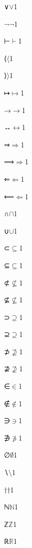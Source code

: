 {{∨}{{\ensuremath{\vee}}}1

{¬}{{\ensuremath{\neg}}}1

{⊢}{{\ensuremath{\vdash}}}1





{⟨}{{\ensuremath{\langle}}}1

{⟩}{{\ensuremath{\rangle}}}1



{↦}{{\ensuremath{\mapsto}}}1

{→}{{\ensuremath{\rightarrow}}}1

{↔}{{\ensuremath{\leftrightarrow}}}1

{⇒}{{\ensuremath{\Rightarrow}}}1

{⟹}{{\ensuremath{\Longrightarrow}}}1

{⇐}{{\ensuremath{\Leftarrow}}}1

{⟸}{{\ensuremath{\Longleftarrow}}}1



{∩}{{\ensuremath{\cap}}}1

{∪}{{\ensuremath{\cup}}}1

{⊂}{{\ensuremath{\subseteq}}}1

{⊆}{{\ensuremath{\subseteq}}}1

{⊄}{{\ensuremath{\nsubseteq}}}1

{⊈}{{\ensuremath{\nsubseteq}}}1

{⊃}{{\ensuremath{\supseteq}}}1

{⊇}{{\ensuremath{\supseteq}}}1

{⊅}{{\ensuremath{\nsupseteq}}}1

{⊉}{{\ensuremath{\nsupseteq}}}1

{∈}{{\ensuremath{\in}}}1

{∉}{{\ensuremath{\notin}}}1

{∋}{{\ensuremath{\ni}}}1

{∌}{{\ensuremath{\notni}}}1

{∅}{{\ensuremath{\emptyset}}}1



{∖}{{\ensuremath{\setminus}}}1

{†}{{\ensuremath{\dag}}}1



{ℕ}{{\ensuremath{\mathbb{N}}}}1

{ℤ}{{\ensuremath{\mathbb{Z}}}}1

{ℝ}{{\ensuremath{\mathbb{R}}}}1

}
